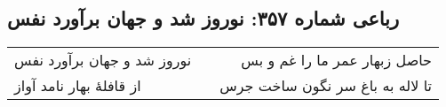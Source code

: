 \begin{center}
\section*{رباعی شماره ۳۵۷: نوروز شد و جهان برآورد نفس}
\label{sec:sh357}
\begin{longtable}{l p{0.5cm} r}
نوروز شد و جهان برآورد نفس
&&
حاصل زبهار عمر ما را غم و بس
\\
از قافلهٔ بهار نامد آواز
&&
تا لاله به باغ سر نگون ساخت جرس
\\
\end{longtable}
\end{center}
